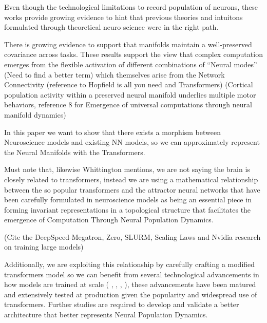 \documentclass{article}
\begin{document}
Even though the technological limitations to record population of neurons, these works provide growing evidence to hint that previous theories and intuitons formulated through theoretical neuro science were in the right path. 

There is growing evidence to support that manifolds maintain a well-preserved covariance across tasks. These results support the view that complex computation emerges from the flexible activation of different combinations of “Neural modes” (Need to find a better term) which themselves arise from the Network Connectivity (reference to Hopfield is all you need and Transformers) (Cortical population activity within a preserved neural manifold underlies multiple motor behaviors, reference 8 for Emergence of universal computations through neural manifold dynamics)

In this paper we want to show that there exists a morphism between Neuroscience models and existing NN models, so we can approximately represent the Neural Manifolds with the Transformers.

Must note that, likewise Whittington \cite{whittington2021relating} mentions, we are not saying the brain is closely related to transformers, instead we are using a mathematical relationship between the so popular transformers and the attractor neural networks that have been carefully formulated in neuroscience models as being an essential piece in forming invariant representations in a topological structure that facilitates the emergence of Computation Through Neural Population Dynamics.

(Cite the DeepSpeed-Megatron, Zero, SLURM, Scaling Laws and Nvidia research on training large models)

Additionally, we are exploiting this relationship by carefully crafting a modified transformers model so we can benefit from several technological advancements in how models are trained at scale ( \cite{DBLP:journals/corr/abs-1910-02054}, \cite{DBLP:journals/corr/abs-2201-11990}, \cite{DBLP:journals/corr/abs-2104-04473}, \cite{DBLP:journals/corr/abs-2001-08361} ), these advancements have been matured and extensively tested at production given the popularity and widespread use of transformers. Further studies are required to develop and validate a better architecture that better represents Neural Population Dynamics.

\end{document}
